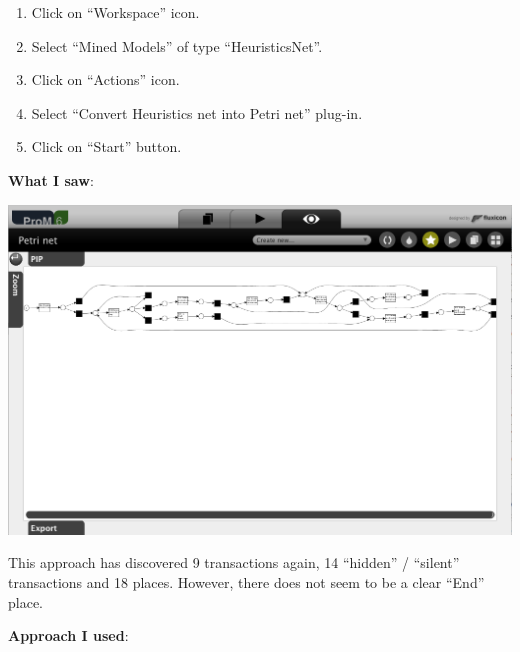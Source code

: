 \documentclass[]{article}
\begin{document}
\begin{enumerate}
\def\labelenumi{\arabic{enumi}.}
\setcounter{enumi}{39}
\itemsep1pt\parskip0pt
\item
  Click on ``Workspace'' icon.\\
\item
  Select ``Mined Models'' of type ``HeuristicsNet''.\\
\item
  Click on ``Actions'' icon.\\
\item
  Select ``Convert Heuristics net into Petri net'' plug-in.\\
\item
  Click on ``Start'' button.
\end{enumerate}

\textbf{What I saw}:

\includegraphics{CoSeLoG_Step_05_Filter96_PetriNet_Heuristics.png}

This approach has discovered 9 transactions again, 14 ``hidden'' /
``silent'' transactions and 18 places. However, there does not seem to
be a clear ``End'' place.

\textbf{Approach I used}:
\end{document}
